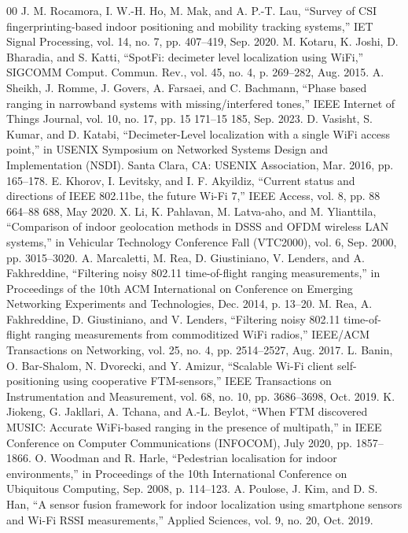 \documentclass[journal]{IEEEtran}
\begin{document}
\begin{thebibliography}{00}
 J. M. Rocamora, I. W.-H. Ho, M. Mak, and A. P.-T. Lau, “Survey of CSI fingerprinting-based indoor positioning and mobility tracking systems,” IET Signal Processing, vol. 14, no. 7, pp. 407–419, Sep. 2020.
 M. Kotaru, K. Joshi, D. Bharadia, and S. Katti, “SpotFi: decimeter level localization using WiFi,” SIGCOMM Comput. Commun. Rev., vol. 45, no. 4, p. 269–282, Aug. 2015.
 A. Sheikh, J. Romme, J. Govers, A. Farsaei, and C. Bachmann, “Phase based ranging in narrowband systems with missing/interfered tones,” IEEE Internet of Things Journal, vol. 10, no. 17, pp. 15 171–15 185, Sep. 2023.
 D. Vasisht, S. Kumar, and D. Katabi, “Decimeter-Level localization with a single WiFi access point,” in USENIX Symposium on Networked Systems Design and Implementation (NSDI). Santa Clara, CA: USENIX Association, Mar. 2016, pp. 165–178.
 E. Khorov, I. Levitsky, and I. F. Akyildiz, “Current status and directions of IEEE 802.11be, the future Wi-Fi 7,” IEEE Access, vol. 8, pp. 88 664–88 688, May 2020.
 X. Li, K. Pahlavan, M. Latva-aho, and M. Ylianttila, “Comparison of indoor geolocation methods in DSSS and OFDM wireless LAN systems,” in Vehicular Technology Conference Fall (VTC2000), vol. 6, Sep. 2000, pp. 3015–3020.
 A. Marcaletti, M. Rea, D. Giustiniano, V. Lenders, and A. Fakhreddine, “Filtering noisy 802.11 time-of-flight ranging measurements,” in Proceedings of the 10th ACM International on Conference on Emerging Networking Experiments and Technologies, Dec. 2014, p. 13–20.
 M. Rea, A. Fakhreddine, D. Giustiniano, and V. Lenders, “Filtering noisy 802.11 time-of-flight ranging measurements from commoditized WiFi radios,” IEEE/ACM Transactions on Networking, vol. 25, no. 4, pp. 2514–2527, Aug. 2017.
 L. Banin, O. Bar-Shalom, N. Dvorecki, and Y. Amizur, “Scalable Wi-Fi client self-positioning using cooperative FTM-sensors,” IEEE Transactions on Instrumentation and Measurement, vol. 68, no. 10, pp. 3686–3698, Oct. 2019.
 K. Jiokeng, G. Jakllari, A. Tchana, and A.-L. Beylot, “When FTM discovered MUSIC: Accurate WiFi-based ranging in the presence of multipath,” in IEEE Conference on Computer Communications (INFOCOM), July 2020, pp. 1857–1866.
 O. Woodman and R. Harle, “Pedestrian localisation for indoor environments,” in Proceedings of the 10th International Conference on Ubiquitous Computing, Sep. 2008, p. 114–123.
 A. Poulose, J. Kim, and D. S. Han, “A sensor fusion framework for indoor localization using smartphone sensors and Wi-Fi RSSI measurements,” Applied Sciences, vol. 9, no. 20, Oct. 2019.

\end{thebibliography}
\end{document}
